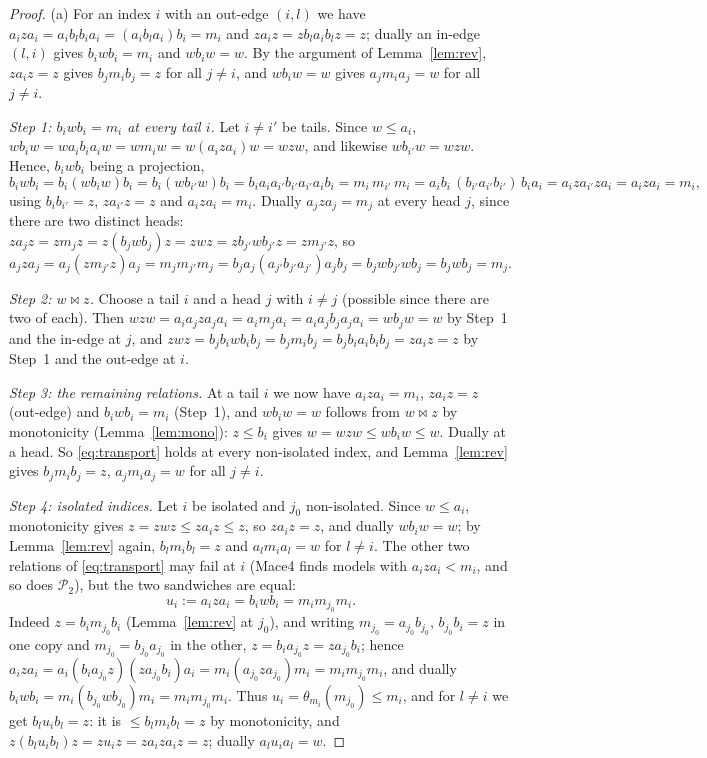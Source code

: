 \documentclass[11pt]{amsart}
\theoremstyle{definition}
\renewcommand{\P}{\mathcal{P}}
\begin{document}
\begin{proof}
(a) For an index $i$ with an out-edge $(i,l)$ we have $a_iza_i=a_ib_lb_ia_i=(a_ib_la_i)b_i=m_i$ and $za_iz=zb_la_ib_lz=z$; dually an in-edge $(l,i)$ gives $b_iwb_i=m_i$ and $wb_iw=w$. By the argument of Lemma~\ref{lem:rev}, $za_iz=z$ gives $b_jm_ib_j=z$ for all $j\ne i$, and $wb_iw=w$ gives $a_jm_ia_j=w$ for all $j\ne i$.

\emph{Step 1: $b_iwb_i=m_i$ at every tail $i$.} Let $i\ne i'$ be tails. Since $w\le a_i$, $wb_iw=wa_ib_ia_iw=wm_iw=w(a_iza_i)w=wzw$, and likewise $wb_{i'}w=wzw$. Hence, $b_iwb_i$ being a projection,
\[
b_iwb_i=b_i(wb_iw)b_i=b_i(wb_{i'}w)b_i=b_ia_ia_{i'}b_{i'}a_{i'}a_ib_i=m_i\,m_{i'}\,m_i=a_ib_i\,(b_{i'}a_{i'}b_{i'})\,b_ia_i=a_iza_{i'}za_i=a_iza_i=m_i ,
\]
using $b_ib_{i'}=z$, $za_{i'}z=z$ and $a_iza_i=m_i$. Dually $a_jza_j=m_j$ at every head $j$, since there are two distinct heads: $za_jz=zm_jz=z(b_jwb_j)z=zwz=zb_{j'}wb_{j'}z=zm_{j'}z$, so $a_jza_j=a_j(zm_{j'}z)a_j=m_jm_{j'}m_j=b_ja_j(a_{j'}b_{j'}a_{j'})a_jb_j=b_jwb_{j'}wb_j=b_jwb_j=m_j$.

\emph{Step 2: $w\bowtie z$.} Choose a tail $i$ and a head $j$ with $i\ne j$ (possible since there are two of each). Then $wzw=a_ia_jza_ja_i=a_im_ja_i=a_ia_jb_ja_ja_i=wb_jw=w$ by Step~1 and the in-edge at $j$, and $zwz=b_jb_iwb_ib_j=b_jm_ib_j=b_jb_ia_ib_ib_j=za_iz=z$ by Step~1 and the out-edge at $i$.

\emph{Step 3: the remaining relations.} At a tail $i$ we now have $a_iza_i=m_i$, $za_iz=z$ (out-edge) and $b_iwb_i=m_i$ (Step~1), and $wb_iw=w$ follows from $w\bowtie z$ by monotonicity (Lemma~\ref{lem:mono}): $z\le b_i$ gives $w=wzw\le wb_iw\le w$. Dually at a head. So \eqref{eq:transport} holds at every non-isolated index, and Lemma~\ref{lem:rev} gives $b_jm_ib_j=z$, $a_jm_ia_j=w$ for all $j\ne i$.

\emph{Step 4: isolated indices.} Let $i$ be isolated and $j_0$ non-isolated. Since $w\le a_i$, monotonicity gives $z=zwz\le za_iz\le z$, so $za_iz=z$, and dually $wb_iw=w$; by Lemma~\ref{lem:rev} again, $b_lm_ib_l=z$ and $a_lm_ia_l=w$ for $l\ne i$. The other two relations of \eqref{eq:transport} may fail at $i$ (Mace4 finds models with $a_iza_i<m_i$, and so does $\P_2$), but the two sandwiches are equal:
\[
u_i:=a_iza_i=b_iwb_i=m_im_{j_0}m_i .
\]
Indeed $z=b_im_{j_0}b_i$ (Lemma~\ref{lem:rev} at $j_0$), and writing $m_{j_0}=a_{j_0}b_{j_0}$, $b_{j_0}b_i=z$ in one copy and $m_{j_0}=b_{j_0}a_{j_0}$ in the other, $z=b_ia_{j_0}z=za_{j_0}b_i$; hence $a_iza_i=a_i(b_ia_{j_0}z)(za_{j_0}b_i)a_i=m_i(a_{j_0}za_{j_0})m_i=m_im_{j_0}m_i$, and dually $b_iwb_i=m_i(b_{j_0}wb_{j_0})m_i=m_im_{j_0}m_i$. Thus $u_i=\theta_{m_i}(m_{j_0})\le m_i$, and for $l\ne i$ we get $b_lu_ib_l=z$: it is $\le b_lm_ib_l=z$ by monotonicity, and $z(b_lu_ib_l)z=zu_iz=za_iza_iz=z$; dually $a_lu_ia_l=w$.


\end{proof}
\end{document}
